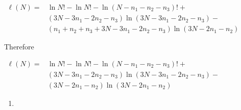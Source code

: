 \documentclass[]{article}
\begin{document}
\(\begin{aligned}\ell(N)=&\ln N!-\ln N!-\ln (N-n_1-n_2-n_3)!+ \\&(3N-3n_1-2n_2-n_3)\ln(3N - 3n_1-2n_2-n_3) - \\&(n_1+n_2+n_3+3N-3n_1-2n_2-n_3)\ln (3N-2n_1-n_2)\end{aligned}\)

Therefore

\(\begin{aligned}\ell(N)=&\ln N!-\ln N!-\ln (N-n_1-n_2-n_3)!+ \\&(3N-3n_1-2n_2-n_3)\ln(3N - 3n_1-2n_2-n_3) - \\&(3N-2n_1-n_2)\ln (3N-2n_1-n_2)\end{aligned}\)

\begin{enumerate}
\def\labelenumi{\alph{enumi})}
\setcounter{enumi}{6}
\item
\end{enumerate}
\end{document}
